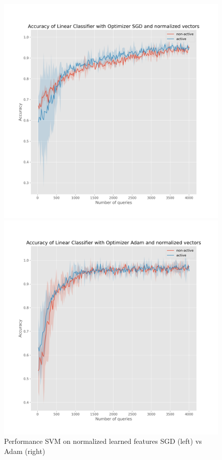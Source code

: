 \documentclass{article}
\begin{document}
\begin{figure}[h]
  \centering
  \begin{minipage}{.45\textwidth}
    \centering
    \includegraphics[width=\linewidth]{active-vs-base-moons-linear-loss-SGD-normalized-ci}
  \end{minipage}%
  \begin{minipage}{.45\textwidth}
    \centering
    \includegraphics[width=\linewidth]{active-vs-base-moons-linear-loss-Adam-normalized-ci}
  \end{minipage}
  \caption{Performance SVM on normalized learned features SGD (left) vs Adam (right)}\label{fig:svm-normalized-ci}
\end{figure}
\end{document}
